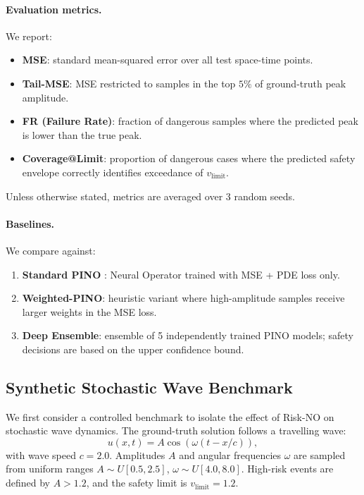 \documentclass{article}
\theoremstyle{plain}
\theoremstyle{definition}
\theoremstyle{remark}
\begin{document}
\paragraph{Evaluation metrics.}
We report:

\begin{itemize}
    \item \textbf{MSE}: standard mean-squared error over all test space-time points.
    \item \textbf{Tail-MSE}: MSE restricted to samples in the top $5\%$ of ground-truth peak amplitude.
    \item \textbf{FR (Failure Rate)}: fraction of dangerous samples where the predicted peak is lower than the true peak.
    \item \textbf{Coverage@Limit}: proportion of dangerous cases where the predicted safety envelope correctly identifies exceedance of $v_{\text{limit}}$.
\end{itemize}

Unless otherwise stated, metrics are averaged over 3 random seeds.

\paragraph{Baselines.}
We compare against:

\begin{enumerate}
    \item \textbf{Standard PINO} \citep{li2021physics}: Neural Operator trained with MSE + PDE loss only.
    \item \textbf{Weighted-PINO}: heuristic variant where high-amplitude samples receive larger weights in the MSE loss.
    \item \textbf{Deep Ensemble}: ensemble of 5 independently trained PINO models; safety decisions are based on the upper confidence bound.
\end{enumerate}

\subsection{Synthetic Stochastic Wave Benchmark}

We first consider a controlled benchmark to isolate the effect of Risk-NO on stochastic wave dynamics. The ground-truth solution follows a travelling wave:
\begin{equation}
    u(x,t) = A \cos(\omega (t - x/c)),
\end{equation}
with wave speed $c=2.0$. Amplitudes $A$ and angular frequencies $\omega$ are sampled from uniform ranges $A\sim U[0.5,2.5]$, $\omega\sim U[4.0,8.0]$. High-risk events are defined by $A > 1.2$, and the safety limit is $v_{\text{limit}}=1.2$.
\end{document}
